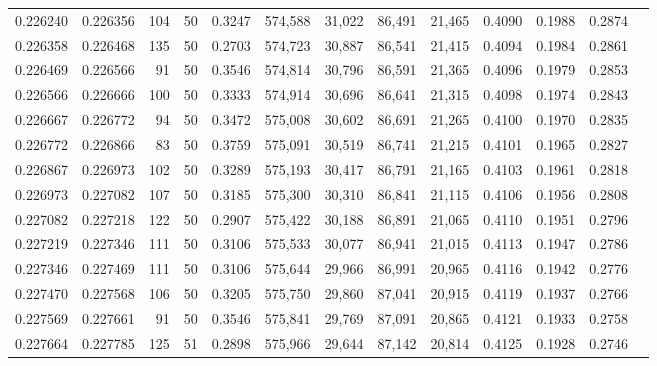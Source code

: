 \begin{tabular}{rrrrrrrrrrrrr}
0.226240 & 0.226356 &   104 &  50 &                                     0.3247 & 574,588 &  31,022 &  86,491 &  21,465 & 0.4090 & 0.1988 & 0.2874 \\
0.226358 & 0.226468 &   135 &  50 &                                     0.2703 & 574,723 &  30,887 &  86,541 &  21,415 & 0.4094 & 0.1984 & 0.2861 \\
0.226469 & 0.226566 &    91 &  50 &                                     0.3546 & 574,814 &  30,796 &  86,591 &  21,365 & 0.4096 & 0.1979 & 0.2853 \\
0.226566 & 0.226666 &   100 &  50 &                                     0.3333 & 574,914 &  30,696 &  86,641 &  21,315 & 0.4098 & 0.1974 & 0.2843 \\
0.226667 & 0.226772 &    94 &  50 &                                     0.3472 & 575,008 &  30,602 &  86,691 &  21,265 & 0.4100 & 0.1970 & 0.2835 \\
0.226772 & 0.226866 &    83 &  50 &                                     0.3759 & 575,091 &  30,519 &  86,741 &  21,215 & 0.4101 & 0.1965 & 0.2827 \\
0.226867 & 0.226973 &   102 &  50 &                                     0.3289 & 575,193 &  30,417 &  86,791 &  21,165 & 0.4103 & 0.1961 & 0.2818 \\
0.226973 & 0.227082 &   107 &  50 &                                     0.3185 & 575,300 &  30,310 &  86,841 &  21,115 & 0.4106 & 0.1956 & 0.2808 \\
0.227082 & 0.227218 &   122 &  50 &                                     0.2907 & 575,422 &  30,188 &  86,891 &  21,065 & 0.4110 & 0.1951 & 0.2796 \\
0.227219 & 0.227346 &   111 &  50 &                                     0.3106 & 575,533 &  30,077 &  86,941 &  21,015 & 0.4113 & 0.1947 & 0.2786 \\
0.227346 & 0.227469 &   111 &  50 &                                     0.3106 & 575,644 &  29,966 &  86,991 &  20,965 & 0.4116 & 0.1942 & 0.2776 \\
0.227470 & 0.227568 &   106 &  50 &                                     0.3205 & 575,750 &  29,860 &  87,041 &  20,915 & 0.4119 & 0.1937 & 0.2766 \\
0.227569 & 0.227661 &    91 &  50 &                                     0.3546 & 575,841 &  29,769 &  87,091 &  20,865 & 0.4121 & 0.1933 & 0.2758 \\
0.227664 & 0.227785 &   125 &  51 &                                     0.2898 & 575,966 &  29,644 &  87,142 &  20,814 & 0.4125 & 0.1928 & 0.2746 \\

\end{tabular}
